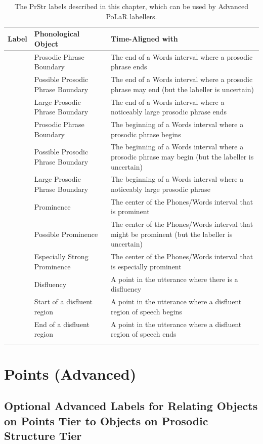 \documentclass[11pt, twoside]{memoir}
\def\textlabel#1{{\relsize{-.5}\fontspec[Mapping=tex-text]{Roboto Mono}{#1}}}
\begin{document}
\begin{longtable}{cp{.3\linewidth}p{.45\linewidth}}
	\toprule
	\textbf{Label} & \textbf{Phonological Object} & \textbf{Time-Aligned with} \tabularnewline
	\midrule
	\endhead
	\rowcolor{green}
	\textlabel{]} & Prosodic Phrase Boundary & The end of a Words interval where a prosodic phrase ends \tabularnewline
	\textlabel{?]} & Possible Prosodic Phrase Boundary & The end of a Words interval where a prosodic phrase may end (but the labeller is uncertain) \tabularnewline
	\textlabel{]]} & Large Prosodic Phrase Boundary & The end of a Words interval where a noticeably large prosodic phrase ends \tabularnewline
	\textlabel{[} & Prosodic Phrase Boundary & The beginning of a Words interval where a prosodic phrase begins \tabularnewline
	\textlabel{?[} & Possible Prosodic Phrase Boundary & The beginning of a Words interval where a prosodic phrase may begin (but the labeller is uncertain) \tabularnewline
	\textlabel{[[} & Large Prosodic Phrase Boundary & The beginning of a Words interval where a noticeably large prosodic phrase \tabularnewline
	\hline
	\rowcolor{green}
	\textlabel{*} & Prominence & The center of the Phones/Words interval that is prominent\tabularnewline
	\textlabel{?*} & Possible Prominence & The center of the Phones/Words interval that might be prominent (but the labeller is uncertain) \tabularnewline
	\textlabel{**} & Especially Strong Prominence & The center of the Phones/Words interval that is especially prominent \tabularnewline
	\hline
	\textlabel{d} & Disfluency & A point in the utterance where there is a disfluency\tabularnewline
	\textlabel{\{d} & Start of a disfluent region & A point in the utterance where a disfluent region of speech begins\tabularnewline
	\textlabel{d\}} & End of a disfluent region & A point in the utterance where a disfluent region of speech ends\tabularnewline
	\bottomrule
	\caption{The PrStr labels described in this chapter, which can be used by Advanced PoLaR labellers.}
\end{longtable}


\section{Points (Advanced)}\label{sec:points-advanced}

\subsection{Optional Advanced Labels for Relating Objects on Points Tier to Objects on Prosodic Structure Tier}\label{sec:optional-advanced-labels-for-relating-points-tier-objects-to-prosodic-structure-tier-objects}
\end{document}
